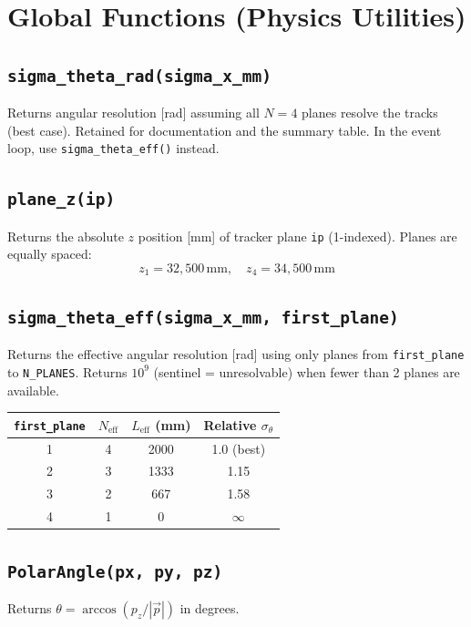 \documentclass[11pt]{article}
\newcommand{\sth}{\sigma_\theta}
\begin{document}
\section{Global Functions (Physics Utilities)}

\subsection{\texttt{sigma\_theta\_rad(sigma\_x\_mm)}}

Returns angular resolution [rad] assuming all $N=4$ planes resolve the
tracks (best case). Retained for documentation and the summary table.
In the event loop, use \texttt{sigma\_theta\_eff()} instead.

\subsection{\texttt{plane\_z(ip)}}

Returns the absolute $z$ position [mm] of tracker plane \texttt{ip}
(1-indexed). Planes are equally spaced:
\[
  z_1 = 32{,}500\,\text{mm}, \quad z_4 = 34{,}500\,\text{mm}
\]

\subsection{\texttt{sigma\_theta\_eff(sigma\_x\_mm, first\_plane)}}

Returns the effective angular resolution [rad] using only planes from
\texttt{first\_plane} to \texttt{N\_PLANES}. Returns $10^9$ (sentinel
= unresolvable) when fewer than 2 planes are available.

\begin{center}
\begin{tabular}{cccc}
\toprule
\texttt{first\_plane} & $N_\text{eff}$ & $L_\text{eff}$ (mm)
    & Relative $\sth$ \\
\midrule
1 & 4 & 2000 & 1.0 (best) \\
2 & 3 & 1333 & 1.15 \\
3 & 2 & 667  & 1.58 \\
4 & 1 & 0    & $\infty$ \\
\bottomrule
\end{tabular}
\end{center}

\subsection{\texttt{PolarAngle(px, py, pz)}}
Returns $\theta = \arccos(p_z/|\vec{p}|)$ in degrees.
\end{document}
